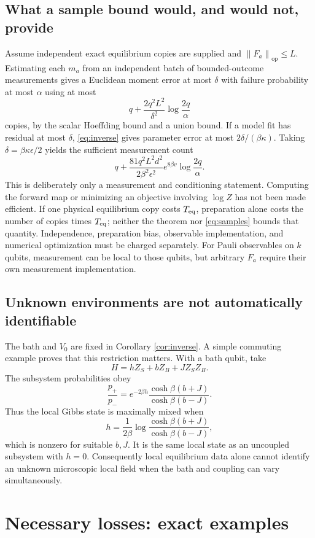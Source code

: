 \documentclass[11pt]{article}
\theoremstyle{remark}\newtheorem{remark}[theorem]{Remark}
\newcommand{\op}{\mathrm{op}}
\newcommand{\norm}[1]{\left\lVert #1\right\rVert}
\begin{document}
\subsection{What a sample bound would, and would not, provide}
Assume independent exact equilibrium copies are supplied and $\norm{F_a}_\op\leq L$. Estimating each $m_a$ from an independent batch of bounded-outcome measurements gives a Euclidean moment error at most $\delta$ with failure probability at most $\alpha$ using at most
\[
 q+\frac{2q^2L^2}{\delta^2}\log\frac{2q}{\alpha}
\]
copies, by the scalar Hoeffding bound and a union bound. If a model fit has residual at most $\delta$, \eqref{eq:inverse} gives parameter error at most $2\delta/(\beta\kappa)$. Taking $\delta=\beta\kappa\epsilon/2$ yields the sufficient measurement count
\begin{equation}\label{eq:samples}
 q+\frac{81q^2L^2d^2}{2\beta^2\epsilon^2}
 e^{8\beta v}\log\frac{2q}{\alpha}.
\end{equation}
This is deliberately only a measurement and conditioning statement. Computing the forward map or minimizing an objective involving $\log Z$ has not been made efficient. If one physical equilibrium copy costs $T_{\rm eq}$, preparation alone costs the number of copies times $T_{\rm eq}$; neither the theorem nor \eqref{eq:samples} bounds that quantity. Independence, preparation bias, observable implementation, and numerical optimization must be charged separately. For Pauli observables on $k$ qubits, measurement can be local to those qubits, but arbitrary $F_a$ require their own measurement implementation.

\subsection{Unknown environments are not automatically identifiable}
The bath and $V_0$ are fixed in Corollary \ref{cor:inverse}. A simple commuting example proves that this restriction matters. With a bath qubit, take
\[
 H=hZ_S+bZ_B+JZ_SZ_B.
\]
The subsystem probabilities obey
\[
 \frac{p_+}{p_-}=e^{-2\beta h}
 \frac{\cosh\beta(b+J)}{\cosh\beta(b-J)}.
\]
Thus the local Gibbs state is maximally mixed when
\[
 h=\frac{1}{2\beta}\log
 \frac{\cosh\beta(b+J)}{\cosh\beta(b-J)},
\]
which is nonzero for suitable $b,J$. It is the same local state as an uncoupled subsystem with $h=0$. Consequently local equilibrium data alone cannot identify an unknown microscopic local field when the bath and coupling can vary simultaneously.

\section{Necessary losses: exact examples}
\end{document}
